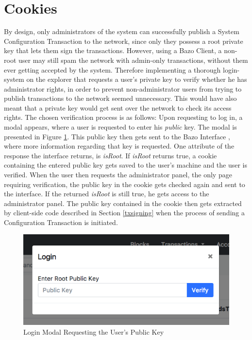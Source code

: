 \section{Cookies} \label{cookies}

By design, only administrators of the system can successfully publish a System Configuration Transaction to the network, since only they possess a root private key that lets them sign the transactions. However, using a Bazo Client, a non-root user may still spam the network with admin-only transactions, without them ever getting accepted by the system. Therefore implementing a thorough login-system on the explorer that requests a user's private key to verify whether he has administrator rights, in order to prevent non-administrator users from trying to publish transactions to the network seemed unnecessary. This would have also meant that a private key would get sent over the network to check its access rights. The chosen verification process is as follows:
Upon requesting to log in, a modal appears, where a user is requested to enter his \emph{public} key. The modal is presented in Figure \ref{fig:login}. This public key then gets sent to the Bazo Interface \cite{marc}, where more information regarding that key is requested. One attribute of the response the interface returns, is \emph{isRoot}. If \emph{isRoot} returns true, a cookie containing the entered public key gets saved to the user's machine and the user is verified. When the user then requests the administrator panel, the only page requiring verification, the public key in the cookie gets checked again and sent to the interface. If the returned \emph{isRoot} is still true, he gets access to the administrator panel. The public key contained in the cookie then gets extracted by client-side code described in Section \ref{txsigning} when the process of sending a Configuration Transaction is initiated.

\begin{figure}
  \includegraphics[scale=0.5]{loginmodal.png}
  \centering
  \caption{Login Modal Requesting the User's Public Key}
  \label{fig:login}
\end{figure}

